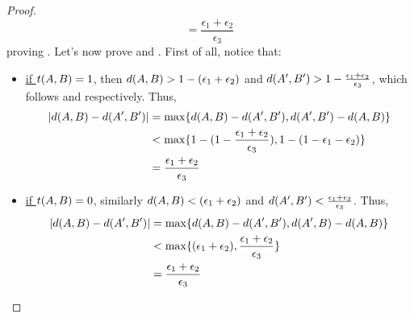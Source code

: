 \begin{lemma}[Lemma 5.17]
\begin{proof}
\[                    = \frac{\epsilon_1 + \epsilon_2}{\epsilon_3}
                \]
                proving .
                Let's now prove  and .
                First of all, notice that:
                \begin{itemize}
                    \item \underline{if $t( A,B ) = 1$}, then $d( A,B ) > 1 - ( \epsilon_1 + \epsilon_2 )$
                        and $d ( A',B' ) > 1 - \frac{\epsilon_1 + \epsilon_2}{\epsilon_3}$, which follows
                         and
                         respectively.
                        Thus,
                        \begin{align*}
                            | d ( A,B ) - d ( A',B' ) |
                                & = \max \{ d ( A,B ) - d ( A',B' ), d ( A',B' ) - d ( A,B ) \} \\
                                & < \max \{  1 - ( 1 - \frac{\epsilon_1 + \epsilon_2}{\epsilon_3} ),
                                    1 - ( 1 - \epsilon_1 - \epsilon_2 ) \} \\
                                & = \frac{\epsilon_1 + \epsilon_2}{\epsilon_3}
                        \end{align*}
                    \item \underline{if $t( A,B ) = 0$}, similarly $d( A,B ) < ( \epsilon_1 + \epsilon_2 )$
                        and $d ( A',B' ) < \frac{\epsilon_1 + \epsilon_2}{\epsilon_3}$.
                        Thus,
                        \begin{align*}
                            | d ( A,B ) - d ( A',B' ) |
                                & = \max \{ d ( A,B ) - d ( A',B' ), d ( A',B ) - d ( A,B ) \} \\
                                & < \max \{ ( \epsilon_1 + \epsilon_2 ), \frac{\epsilon_1 + \epsilon_2}{\epsilon_3} \} \\
                                & = \frac{\epsilon_1 + \epsilon_2}{\epsilon_3}
                        \end{align*}
                \end{itemize}

\end{proof}
\end{lemma}
